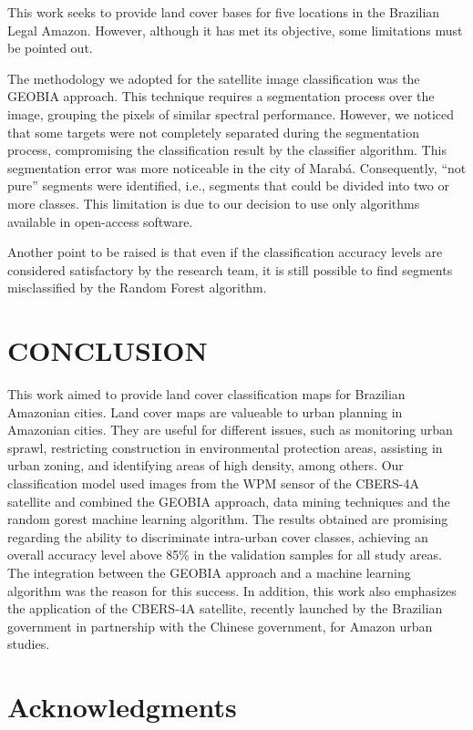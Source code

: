 \documentclass[preprint, 3p,
authoryear]{elsarticle} %
\begin{document}
This work seeks to provide land cover bases for five locations in the
Brazilian Legal Amazon. However, although it has met its objective, some
limitations must be pointed out.

The methodology we adopted for the satellite image classification was
the GEOBIA approach. This technique requires a segmentation process over
the image, grouping the pixels of similar spectral performance. However,
we noticed that some targets were not completely separated during the
segmentation process, compromising the classification result by the
classifier algorithm. This segmentation error was more noticeable in the
city of Marabá. Consequently, ``not pure'' segments were identified,
i.e., segments that could be divided into two or more classes. This
limitation is due to our decision to use only algorithms available in
open-access software.

Another point to be raised is that even if the classification accuracy
levels are considered satisfactory by the research team, it is still
possible to find segments misclassified by the Random Forest algorithm.

\hypertarget{conclusion}{%
\section{CONCLUSION}\label{conclusion}}

This work aimed to provide land cover classification maps for Brazilian
Amazonian cities. Land cover maps are valueable to urban planning in
Amazonian cities. They are useful for different issues, such as
monitoring urban sprawl, restricting construction in environmental
protection areas, assisting in urban zoning, and identifying areas of
high density, among others. Our classification model used images from
the WPM sensor of the CBERS-4A satellite and combined the GEOBIA
approach, data mining techniques and the random gorest machine learning
algorithm. The results obtained are promising regarding the ability to
discriminate intra-urban cover classes, achieving an overall accuracy
level above 85\% in the validation samples for all study areas. The
integration between the GEOBIA approach and a machine learning algorithm
was the reason for this success. In addition, this work also emphasizes
the application of the CBERS-4A satellite, recently launched by the
Brazilian government in partnership with the Chinese government, for
Amazon urban studies.

\hypertarget{acknowledgments}{%
\section{Acknowledgments}\label{acknowledgments}}
\end{document}
